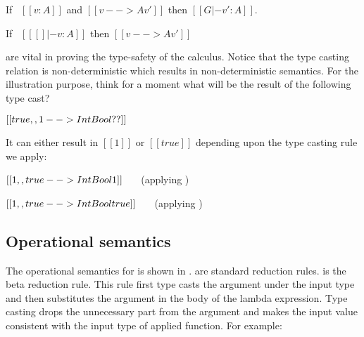 \begin{theorem}
\label{lemma:merge:cast:preservation}
  If \ $[[v : A]]$ and $[[v -->A v']]$ then $[[G |- v' : A]]$.
\end{theorem}


\begin{theorem}\label{lemma:merge:cast:progress}
If \ $[[ [] |- v : A]]$ then $[[v -->A v']]$
\end{theorem}

are vital in proving the type-safety of the calculus.
Notice that the type casting relation is non-deterministic which
results in non-deterministic semantics. For the illustration purpose,
think for a moment what will be the result of the following
type cast?

\begin{center}
$[[true,,1 --> Int\/Bool ??]]$
\end{center}

\noindent It can either result in $[[1]]$ or $[[true]]$ depending upon the type casting
rule we apply:

\begin{center}
$[[1,,true --> Int\/Bool 1]]$ \ \ \ (applying )
\end{center}


\begin{center}
$[[1,,true --> Int\/Bool true]]$ \ \ \ (applying )
\end{center}


\subsection{Operational semantics}

The operational semantics for \namems is shown
in . 
are standard reduction rules.
 is the beta reduction rule.
This rule first type casts the argument under the input type and then
substitutes the argument in the body of the lambda expression.
Type casting drops the unnecessary part from the argument and makes
the input value consistent with the input type of applied function.
For example:

